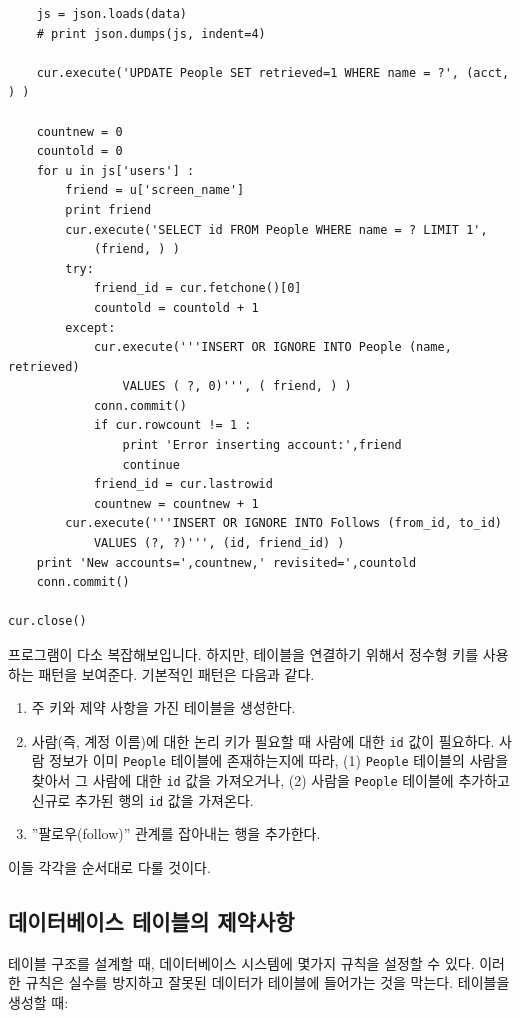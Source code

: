 \begin{verbatim}
    js = json.loads(data)
    # print json.dumps(js, indent=4)

    cur.execute('UPDATE People SET retrieved=1 WHERE name = ?', (acct, ) )

    countnew = 0
    countold = 0
    for u in js['users'] :
        friend = u['screen_name']
        print friend
        cur.execute('SELECT id FROM People WHERE name = ? LIMIT 1', 
            (friend, ) )
        try:
            friend_id = cur.fetchone()[0]
            countold = countold + 1
        except:
            cur.execute('''INSERT OR IGNORE INTO People (name, retrieved) 
                VALUES ( ?, 0)''', ( friend, ) )
            conn.commit()
            if cur.rowcount != 1 :
                print 'Error inserting account:',friend
                continue
            friend_id = cur.lastrowid
            countnew = countnew + 1
        cur.execute('''INSERT OR IGNORE INTO Follows (from_id, to_id) 
            VALUES (?, ?)''', (id, friend_id) )
    print 'New accounts=',countnew,' revisited=',countold
    conn.commit()

cur.close()
\end{verbatim}
\afterverb
%

프로그램이 다소 복잡해보입니다. 하지만, 테이블을 연결하기 위해서 정수형 키를 사용하는 패턴을 보여준다.
기본적인 패턴은 다음과 같다.

\begin{enumerate}

\item 주 키와 제약 사항을 가진 테이블을 생성한다.

\item 사람(즉, 계정 이름)에 대한 논리 키가 필요할 때 사람에 대한 {\tt id} 값이 필요하다.
사람 정보가 이미 {\tt People} 테이블에 존재하는지에 따라,
(1) {\tt People} 테이블의 사람을 찾아서 그 사람에 대한 {\tt id} 값을 가져오거나,
(2) 사람을 {\tt People} 테이블에 추가하고 신규로 추가된 행의 {\tt id} 값을 가져온다.

\item ''팔로우(follow)'' 관계를 잡아내는 행을 추가한다.

\end{enumerate}

이들 각각을 순서대로 다룰 것이다.

\subsection{데이터베이스 테이블의 제약사항}

테이블 구조를 설계할 때, 데이터베이스 시스템에 몇가지 규칙을 설정할 수 있다.
이러한 규칙은 실수를 방지하고 잘못된 데이터가 테이블에 들어가는 것을 막는다.
테이블을 생성할 때:

